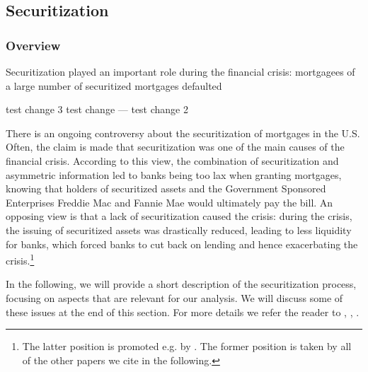 \documentclass[11pt,twopage]{article}
\begin{document}
\subsection{Securitization}
\label{sec:securitization}

\subsubsection{Overview}

Securitization played an important role during the financial crisis: mortgagees of a large number of securitized mortgages defaulted

test change 3
test change
---
test change 2

There is an ongoing controversy about the securitization of mortgages
in the U.S. Often, the claim is made that
securitization was one of the main causes of the financial
crisis. According to this view, the combination of securitization 
and asymmetric information led to banks being too
lax when granting mortgages, knowing that holders of securitized
assets and the Government Sponsored Enterprises Freddie Mac and Fannie
Mae would ultimately pay the bill. An opposing view is that a lack of
securitization caused the crisis: during the crisis, the issuing of
securitized assets was drastically reduced, leading to less liquidity
for banks, which forced banks to cut back on lending and hence
exacerbating the crisis.\footnote{The latter position is promoted e.g. by \cite{albertazzi2011securitization}. The former position is taken by all of the other papers we cite in the following.}

In the following, we will provide a short description of the
securitization process, focusing on aspects that are relevant for our analysis. We will discuss some of these issues
at the end of this section. For more details we refer the reader
to \cite{keys2008did}, \cite{tirole2011illiquidity},
\cite{brunnermeier2009deciphering}.

%
%
\end{document}
